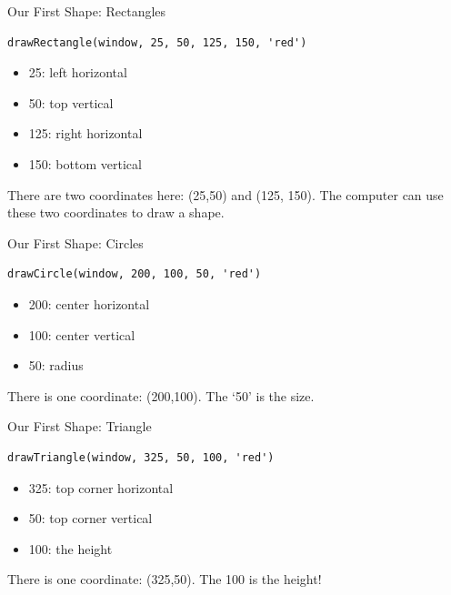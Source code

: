 \documentclass{beamer}
\begin{document}
\begin{frame}[fragile]{Our First Shape: Rectangles}

\begin{verbatim}
drawRectangle(window, 25, 50, 125, 150, 'red')
\end{verbatim}

\begin{itemize}
\item 25: left horizontal
\item 50: top vertical
\item 125: right horizontal
\item 150: bottom vertical
\end{itemize}

There are two coordinates here: (25,50) and (125, 150). The computer can use these two coordinates to draw a shape.

\end{frame}

\begin{frame}[fragile]{Our First Shape: Circles}

\begin{verbatim}
drawCircle(window, 200, 100, 50, 'red')
\end{verbatim}

\begin{itemize}
\item 200: center horizontal
\item 100: center vertical
\item 50: radius
\end{itemize}

There is one coordinate: (200,100). The `50' is the size.

\end{frame}

\begin{frame}[fragile]{Our First Shape: Triangle}

\begin{verbatim}
drawTriangle(window, 325, 50, 100, 'red')
\end{verbatim}

\begin{itemize}
\item 325: top corner horizontal
\item 50: top corner vertical
\item 100: the height
\end{itemize}

There is one coordinate: (325,50). The 100 is the height!

\end{frame}
\end{document}
